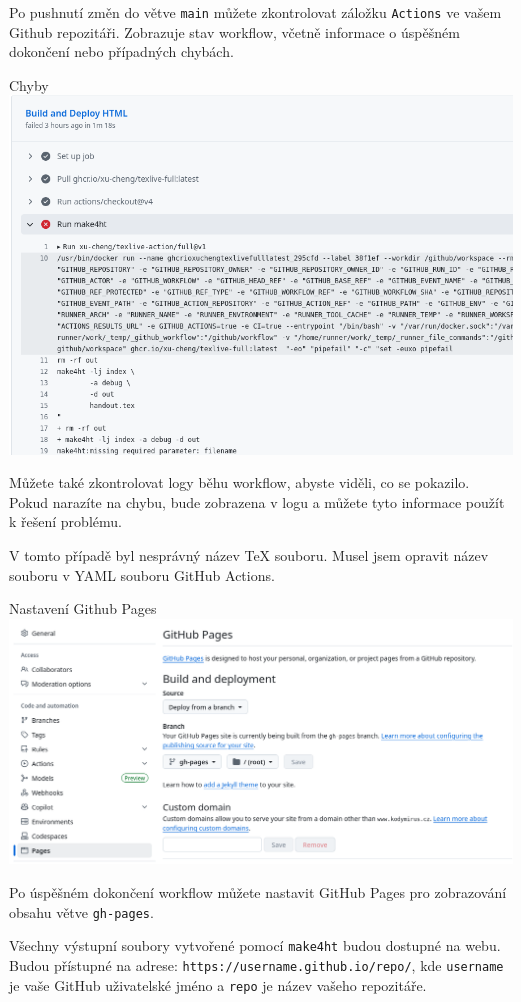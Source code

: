 Po pushnutí změn do větve \texttt{main} můžete zkontrolovat záložku \texttt{Actions} ve vašem
Github repozitáři. Zobrazuje stav workflow, včetně informace o úspěšném dokončení nebo případných chybách.

\begin{frame}[fragile]{Chyby}
\includegraphics[width=\textwidth]{img/github-error.png}
\end{frame}

Můžete také zkontrolovat logy běhu workflow, abyste viděli, co se pokazilo.
Pokud narazíte na chybu, bude zobrazena v logu a můžete tyto informace
použít k řešení problému.

V tomto případě byl nesprávný název TeX souboru. Musel jsem opravit název souboru v YAML souboru GitHub Actions.

\begin{frame}[fragile]{Nastavení Github Pages}
\includegraphics[width=\textwidth]{img/github-pages.png}
\end{frame}

Po úspěšném dokončení workflow můžete nastavit GitHub Pages pro zobrazování obsahu větve \texttt{gh-pages}.

Všechny výstupní soubory vytvořené pomocí \texttt{make4ht} budou dostupné na webu.
Budou přístupné na adrese:
\verb|https://username.github.io/repo/|,
kde \texttt{username} je vaše GitHub uživatelské jméno a \texttt{repo} je název vašeho repozitáře.
